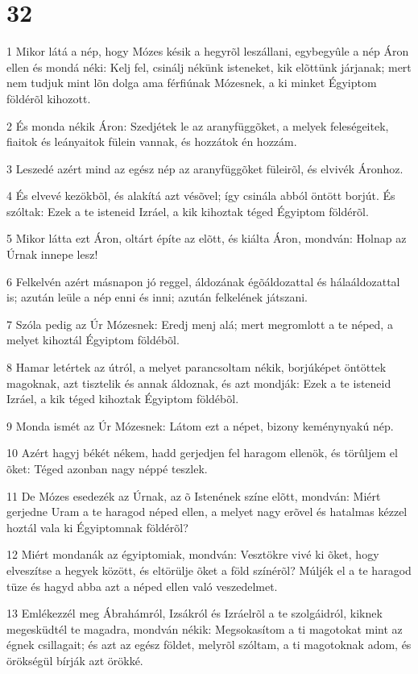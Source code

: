 \chapter{32}

\par 1 Mikor látá a nép, hogy Mózes késik a hegyrõl leszállani, egybegyûle a nép Áron ellen és mondá néki: Kelj fel, csinálj nékünk isteneket, kik elõttünk járjanak; mert nem tudjuk mint lõn dolga ama férfiúnak Mózesnek, a ki minket Égyiptom földérõl kihozott.
\par 2 És monda nékik Áron: Szedjétek le az aranyfüggõket, a melyek feleségeitek, fiaitok és leányaitok fülein vannak, és hozzátok én hozzám.
\par 3 Leszedé azért mind az egész nép az aranyfüggõket füleirõl, és elvivék Áronhoz.
\par 4 És elvevé kezökbõl, és alakítá azt vésõvel; így csinála abból öntött borjút. És szóltak: Ezek a te isteneid Izráel, a kik kihoztak téged Égyiptom földérõl.
\par 5 Mikor látta ezt Áron, oltárt építe az elõtt, és kiálta Áron, mondván: Holnap az Úrnak innepe lesz!
\par 6 Felkelvén azért másnapon jó reggel, áldozának égõáldozattal és hálaáldozattal is; azután leüle a nép enni és inni; azután felkelének játszani.
\par 7 Szóla pedig az Úr Mózesnek: Eredj menj alá; mert megromlott a te néped, a melyet kihoztál Égyiptom földébõl.
\par 8 Hamar letértek az útról, a melyet parancsoltam nékik, borjúképet öntöttek magoknak, azt tisztelik és annak áldoznak, és azt mondják: Ezek a te isteneid Izráel, a kik téged kihoztak Égyiptom földébõl.
\par 9 Monda ismét az Úr Mózesnek: Látom ezt a népet, bizony keménynyakú nép.
\par 10 Azért hagyj békét nékem, hadd gerjedjen fel haragom ellenök, és törûljem el õket: Téged azonban nagy néppé teszlek.
\par 11 De Mózes esedezék az Úrnak, az õ Istenének színe elõtt, mondván: Miért gerjedne Uram a te haragod néped ellen, a melyet nagy erõvel és hatalmas kézzel hoztál vala ki Égyiptomnak földérõl?
\par 12 Miért mondanák az égyiptomiak, mondván: Vesztökre vivé ki õket, hogy elveszítse a hegyek között, és eltörülje õket a föld színérõl? Múljék el a te haragod tüze és hagyd abba azt a néped ellen való veszedelmet.
\par 13 Emlékezzél meg Ábrahámról, Izsákról és Izráelrõl a te szolgáidról, kiknek megesküdtél te magadra, mondván nékik: Megsokasítom a ti magotokat mint az égnek csillagait; és azt az egész földet, melyrõl szóltam, a ti magotoknak adom, és örökségül bírják azt örökké.

